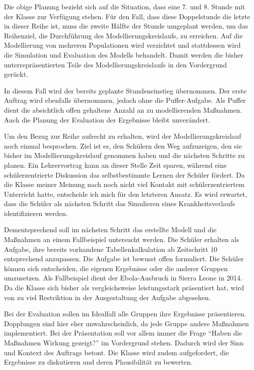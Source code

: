 Die obige Planung bezieht sich auf die Situation, dass eine 7. und 8. Stunde mit der Klasse zur Verfügung stehen. Für den Fall, dass diese Doppelstunde die letzte in dieser Reihe ist, muss die zweite Hälfte der Stunde umgeplant werden, um das Reihenziel, die Durchführung des Modellierungskreislaufs, zu erreichen. Auf die Modellierung von mehreren Populationen wird verzichtet und stattdessen wird die Simulation und Evaluation des Modells behandelt. Damit werden die bisher unterrepräsentierten Teile des Modellierungskreislaufs in den Vordergrund gerückt.

In diesem Fall wird der bereits geplante Stundeneinstieg übernommen. Der erste Auftrag wird ebenfalls übernommen, jedoch ohne die Puffer-Aufgabe. Als Puffer dient die absichtlich offen gehaltene Anzahl an zu modellierenden Maßnahmen. Auch die Planung der Evaluation der Ergebnisse bleibt unverändert. 

Um den Bezug zur Reihe aufrecht zu erhalten, wird der Modellierungskreislauf noch einmal besprochen. Ziel ist es, den Schülern den Weg aufzuzeigen, den sie bisher im Modellierungskreislauf genommen haben und die nächsten Schritte zu planen. Ein Lehrervortrag kann an dieser Stelle Zeit sparen, während eine schülerzentrierte Diskussion das selbstbestimmte Lernen der Schüler fördert. Da die Klasse meiner Meinung nach noch nicht viel Kontakt mit schülerzentriertem Unterricht hatte, entscheide ich mich für den letzteren Ansatz. Es wird erwartet, dass die Schüler als nächsten Schritt das Simulieren eines Krankheitsverlaufs identifizieren werden. 

Dementsprechend soll im nächsten Schritt das erstellte Modell und die Maßnahmen an einem Fallbeispiel untersucht werden. Die Schüler erhalten als Aufgabe, ihre bereits vorhandene Tabellenkalkulation ab Zeitschritt $10$ entsprechend anzupassen. Die Aufgabe ist bewusst offen formuliert. Die Schüler können sich entscheiden, die eigenen Ergebnisse oder die anderer Gruppen umzusetzen. Als Fallbeispiel dient der Ebola-Ausbruch in Sierra Leone in 2014. Da die Klasse sich bisher als vergleichsweise leistungsstark präsentiert hat, wird von zu viel Restriktion in der Ausgestaltung der Aufgabe abgesehen. 

Bei der Evaluation sollen im Idealfall alle Gruppen ihre Ergebnisse präsentieren. Dopplungen sind hier eher unwahrscheinlich, da jede Gruppe andere Maßnahmen implementiert. Bei der Präsentation soll vor allem immer die Frage ``Haben die Maßnahmen Wirkung gezeigt?'' im Vordergrund stehen. Dadurch wird der Sinn und Kontext des Auftrags betont. Die Klasse wird zudem aufgefordert, die Ergebnisse zu diskutieren und deren Plausibilität zu bewerten. 


